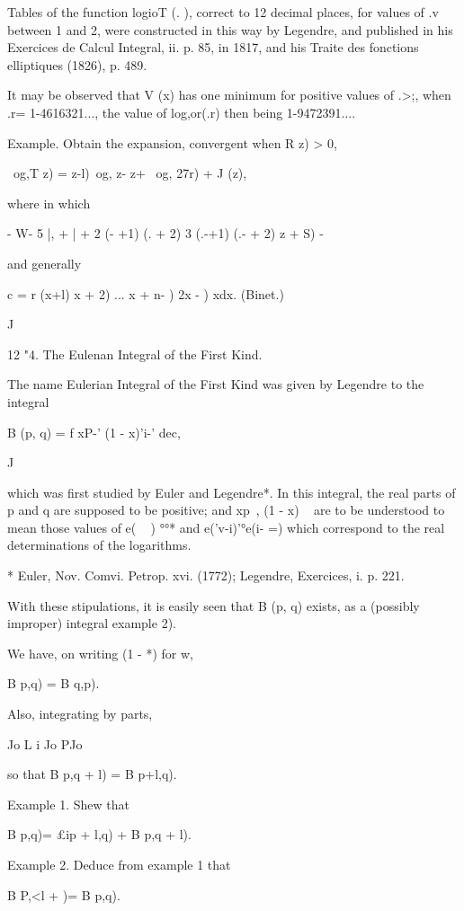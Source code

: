 Tables of the function logioT (. ), correct to 12 decimal places, for
values of .v between 1 and 2, were constructed in this way by
Legendre, and published in his Exercices de Calcul Integral, ii. p.
85, in 1817, and his Traite des fonctions elliptiques (1826), p. 489.

It may be observed that V (x) has one minimum for positive values of
.>;, when .r= 1-4616321..., the value of log,or(.r) then being
1-9472391....

Example. Obtain the expansion, convergent when R z) > 0,

\ og,T z) = z-l)\ og, z- z+ \ og, 27r) + J (z),

where in which

- W- 5 |, + | + 2 (- +1) (. + 2) 3 (.-+1) (.- + 2) z + S) -

and generally

c = r (x+l) x + 2) ... x + n- ) 2x - ) xdx. (Binet.)

J

12 "4. The Eulenan Integral of the First Kind.

The name Eulerian Integral of the First Kind was given by Legendre to
the integral

B (p, q) = f xP-' (1 - x)'i-' dec,

J

which was first studied by Euler and Legendre*. In this integral, the
real parts of p and q are supposed to be positive; and xp~, (1 - x) ~
are to be understood to mean those values of e( ~ ) °°* and
e('v-i)'°e(i- =) which correspond to the real determinations of the
logarithms.

* Euler, Nov. Comvi. Petrop. xvi. (1772); Legendre, Exercices, i. p.
221.

%
%

With these stipulations, it is easily seen that B (p, q) exists, as a
(possibly improper) integral  example 2).

We have, on writing (1 - *) for w,

B p,q) = B q,p).

Also, integrating by parts,

Jo L i Jo PJo

so that B p,q + l) = B p+l,q).

Example 1. Shew that

B p,q)= £ip + l,q) + B p,q + l).

Example 2. Deduce from example 1 that

B P,<l + )= B p,q).

